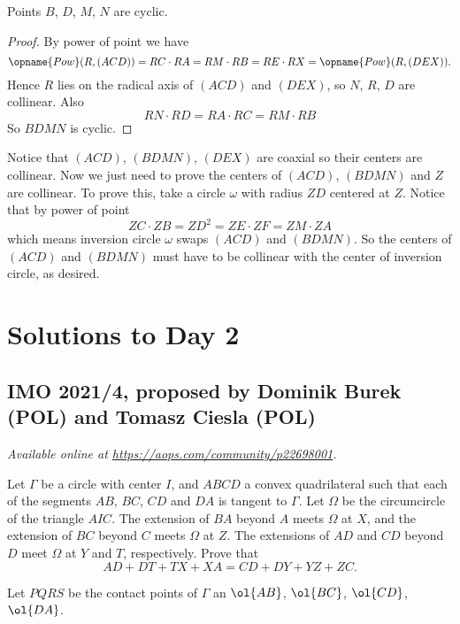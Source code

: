 \documentclass[11pt]{scrartcl}
\begin{document}
\begin{claim*}
    Points $B$, $D$, $M$, $N$ are cyclic.
\end{claim*}

\begin{proof}
  By power of point we have
  \[
    \opname{Pow}(R, (ACD)) = RC \cdot RA = RM \cdot RB
    = RE \cdot RX = \opname{Pow}(R, (DEX)).
  \]
  Hence $R$ lies on the radical axis of $(ACD)$ and
  $(DEX)$, so $N$, $R$, $D$ are collinear. Also
  \[ RN \cdot RD = RA \cdot RC = RM \cdot RB \] So $BDMN$
  is cyclic.
\end{proof}

Notice that $(ACD)$, $(BDMN)$, $(DEX)$ are coaxial so their
centers are collinear. Now we just need to prove the
centers of $(ACD)$, $(BDMN)$ and $Z$ are collinear. To
prove this, take a circle $\omega$ with radius $ZD$
centered at $Z$. Notice that by power of point
\[ ZC \cdot ZB = ZD^2 = ZE \cdot ZF = ZM \cdot ZA \]
which means inversion circle $\omega$ swaps $(ACD)$ and $(BDMN)$.
So the centers of $(ACD)$ and $(BDMN)$ must
have to be collinear with the center of inversion circle, as desired.
\pagebreak

\section{Solutions to Day 2}
\subsection{IMO 2021/4, proposed by Dominik Burek (POL) and Tomasz Ciesla (POL)}
\textsl{Available online at \url{https://aops.com/community/p22698001}.}
\begin{mdframed}[style=mdpurplebox,frametitle={Problem statement}]
Let $\Gamma$ be a circle with center $I$, and $ABCD$ a convex quadrilateral
such that each of the segments $AB$, $BC$, $CD$ and $DA$ is tangent to $\Gamma$.
Let $\Omega$ be the circumcircle of the triangle $AIC$.
The extension of $BA$ beyond $A$ meets $\Omega$ at $X$,
and the extension of $BC$ beyond $C$ meets $\Omega$ at $Z$.
The extensions of $AD$ and $CD$ beyond $D$ meet $\Omega$ at $Y$ and $T$, respectively.
Prove that
\[ AD + DT + TX + XA = CD + DY + YZ + ZC. \]
\end{mdframed}
Let $PQRS$ be the contact points of $\Gamma$ an $\ol{AB}$, $\ol{BC}$,
$\ol{CD}$, $\ol{DA}$.
\end{document}
